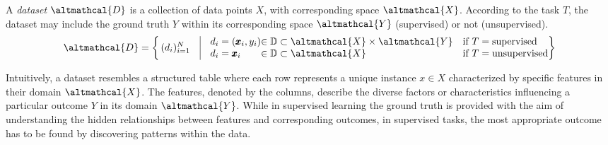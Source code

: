 \begin{definition}[Dataset]\label{def:dataset}
    A \textit{dataset} $\altmathcal{D}$ is a collection of data points $X$, with corresponding space $\altmathcal{X}$.
    According to the task $T$, the dataset may include the ground truth $Y$ within its corresponding space $\altmathcal{Y}$ (supervised) or not (unsupervised).
    \begin{equation*}\label{eq:dataset}
        \altmathcal{D} = \left\lbrace\,
        (d_i)_{i=1}^N  \quad \begin{array}{|@{}l@{}l@{\quad}l@{}}
            \quad d_i = (\pmb{x}_i, y_i) & \in \mathbb{D} \subset \altmathcal{X} \times \altmathcal{Y} & \text{{if }} T = \text{{supervised}} \\
            \quad d_i = \pmb{x}_i & \in \mathbb{D} \subset \altmathcal{X} & \text{{if }} T = \text{{unsupervised}}
        \end{array}
        \right\rbrace
    \end{equation*}
\end{definition}

Intuitively, a dataset resembles a structured table where each row represents a unique instance $x \in X$ characterized by specific features in their domain $\altmathcal{X}$.
The features, denoted by the columns, describe the diverse factors or characteristics influencing a particular outcome $Y$ in its domain $\altmathcal{Y}$.
While in supervised learning the ground truth is provided with the aim of understanding the hidden relationships between features and corresponding outcomes, in supervised tasks, the most appropriate outcome has to be found by discovering patterns within the data.

